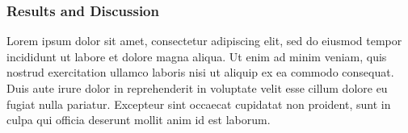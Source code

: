 \subsubsection{Results and Discussion}
Lorem ipsum dolor sit amet, consectetur adipiscing elit, sed do eiusmod tempor incididunt ut labore et dolore magna aliqua. Ut enim ad minim veniam, quis nostrud exercitation ullamco laboris nisi ut aliquip ex ea commodo consequat. Duis aute irure dolor in reprehenderit in voluptate velit esse cillum dolore eu fugiat nulla pariatur. Excepteur sint occaecat cupidatat non proident, sunt in culpa qui officia deserunt mollit anim id est laborum.

